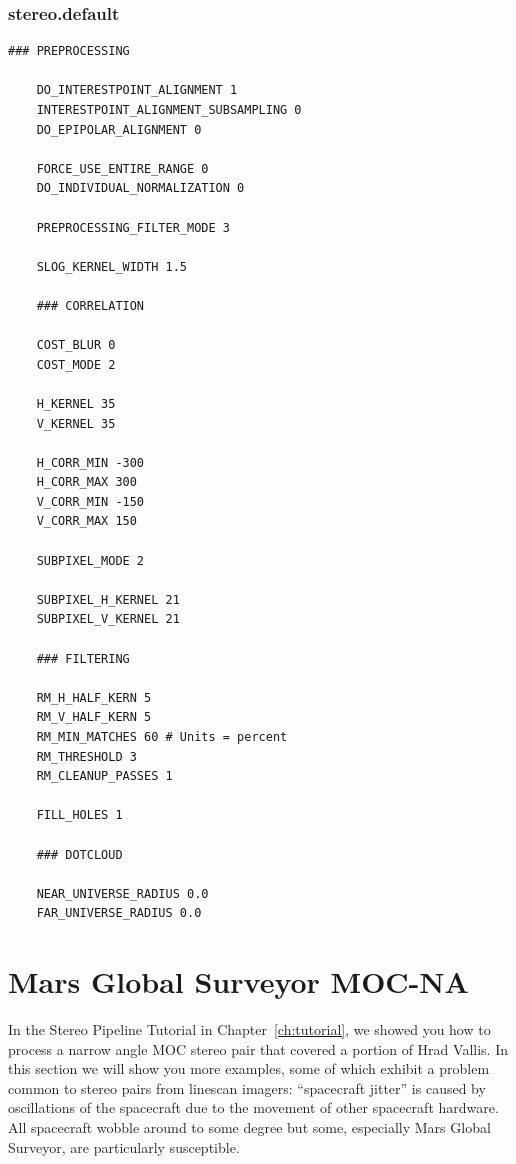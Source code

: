 \vfill

\subsubsection*{stereo.default}

\begin{center}\begin{minipage}{5.5in}
\begin{Verbatim}[frame=single,fontsize=\small,label=stereo.default for CTX North Terra Meridiani]
    ### PREPROCESSING

    DO_INTERESTPOINT_ALIGNMENT 1
    INTERESTPOINT_ALIGNMENT_SUBSAMPLING 0
    DO_EPIPOLAR_ALIGNMENT 0

    FORCE_USE_ENTIRE_RANGE 0
    DO_INDIVIDUAL_NORMALIZATION 0

    PREPROCESSING_FILTER_MODE 3

    SLOG_KERNEL_WIDTH 1.5

    ### CORRELATION

    COST_BLUR 0
    COST_MODE 2

    H_KERNEL 35
    V_KERNEL 35

    H_CORR_MIN -300
    H_CORR_MAX 300
    V_CORR_MIN -150
    V_CORR_MAX 150

    SUBPIXEL_MODE 2

    SUBPIXEL_H_KERNEL 21
    SUBPIXEL_V_KERNEL 21

    ### FILTERING

    RM_H_HALF_KERN 5
    RM_V_HALF_KERN 5
    RM_MIN_MATCHES 60 # Units = percent
    RM_THRESHOLD 3
    RM_CLEANUP_PASSES 1

    FILL_HOLES 1

    ### DOTCLOUD

    NEAR_UNIVERSE_RADIUS 0.0
    FAR_UNIVERSE_RADIUS 0.0
\end{Verbatim}
\end{minipage}\end{center}

\clearpage
\section{Mars Global Surveyor MOC-NA}

In the Stereo Pipeline Tutorial in Chapter~\ref{ch:tutorial}, we
showed you how to process a narrow angle \ac{MOC} stereo pair that
covered a portion of Hrad Vallis. In this section we will show you
more examples, some of which exhibit a problem common to stereo
pairs from linescan imagers: ``spacecraft jitter'' is caused by
oscillations of the spacecraft due to the movement of other spacecraft
hardware.  All spacecraft wobble around to some degree but some,
especially Mars Global Surveyor, are particularly susceptible.

